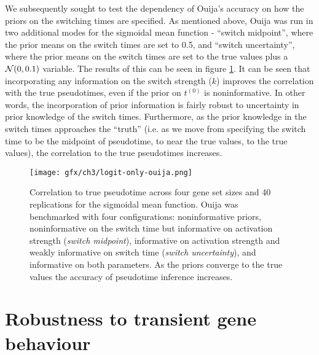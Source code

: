 We subsequently sought to test the dependency of Ouija's accuracy on how the priors on the switching times are specified. As mentioned above, Ouija was run in two additional modes for the sigmoidal mean function - ``switch midpoint'', where the prior means on the switch times are set to 0.5, and ``switch uncertainty'', where the prior means on the switch times are set to the true values plus a $\mathcal{N}(0, 0.1)$ variable. The results of this can be seen in figure \ref{fig:ouija_only}. It can be seen that incorporating any information on the switch strength ($k$) improves the correlation with the true pseudotimes, even if the prior on $t^{(0)}$ is noninformative. In other words, the incorporation of prior information is fairly robust to uncertainty in prior knowledge of the switch times. Furthermore, as the prior knowledge in the switch times approaches the ``truth'' (i.e. as we move from specifying the switch time to be the midpoint of pseudotime, to near the true values, to the true values), the correlation to the true pseudotimes increases.


\begin{figure}%
	\centering
	\texttt{[image: gfx/ch3/logit-only-ouija.png]}
	\caption[Correlation to true pseudotime across sigmoidal simulations.]{Correlation to true pseudotime across four gene set sizes and 40 replications for the sigmoidal mean function. Ouija was benchmarked with four configurations: noninformative priors, noninformative on the switch time but informative on activation strength (\emph{switch midpoint}), informative on activation strength and weakly informative on switch time (\emph{switch uncertainty}), and informative on both parameters. As the priors converge to the true values the accuracy of pseudotime inference increases.}
	\label{fig:ouija_only}
\end{figure}

\section{Robustness to transient gene behaviour}

